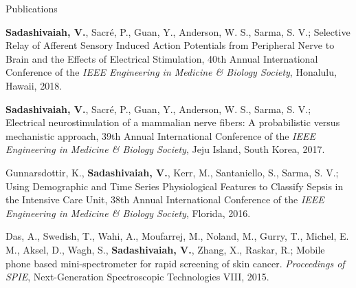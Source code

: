 \documentclass{resume}
\begin{document}
\begin{rSection}{Publications}
\begin{conferences}
\item \textbf{Sadashivaiah, V.}, Sacré, P., Guan, Y., Anderson, W. S., Sarma, S. V.; Selective Relay of Afferent Sensory Induced Action Potentials from Peripheral Nerve to Brain and the Effects of Electrical Stimulation, 40th Annual International Conference of the \textit{IEEE Engineering in Medicine \& Biology Society}, Honalulu, Hawaii, 2018.

\item \textbf{Sadashivaiah, V.}, Sacré, P., Guan, Y., Anderson, W. S., Sarma, S. V.; Electrical neurostimulation of a mammalian nerve fibers: A probabilistic versus mechanistic approach, 39th Annual International Conference of the \textit{IEEE Engineering in Medicine \& Biology Society}, Jeju Island, South Korea, 2017.

\item Gunnarsdottir, K., \textbf{Sadashivaiah, V.}, Kerr, M., Santaniello, S., Sarma, S. V.; Using Demographic and Time Series Physiological Features to Classify Sepsis in the Intensive Care Unit, 38th Annual International Conference of the \textit{IEEE Engineering in Medicine \& Biology Society}, Florida, 2016.

\item Das, A., Swedish, T., Wahi, A., Moufarrej, M., Noland, M., Gurry, T., Michel, E. M., Aksel, D., Wagh, S., \textbf{Sadashivaiah, V.}, Zhang, X., Raskar, R.; Mobile phone based mini-spectrometer for rapid screening of skin cancer. \textit{Proceedings of SPIE}, Next-Generation Spectroscopic Technologies VIII, 2015.
\end{conferences}
\end{rSection} 
\end{document}
